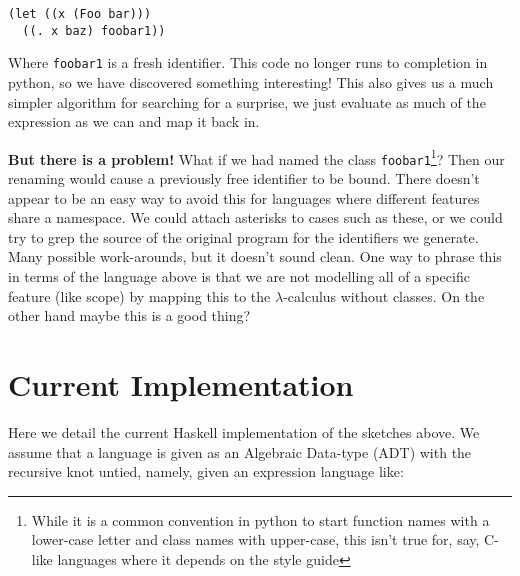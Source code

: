 \documentclass[12pt]{article}
\begin{document}
\begin{verbatim}
(let ((x (Foo bar)))
  ((. x baz) foobar1))
\end{verbatim}

Where \texttt{foobar1} is a fresh identifier. This code no longer runs to
completion in python, so we have discovered something interesting! This also
gives us a much simpler algorithm for searching for a surprise, we just
evaluate as much of the expression as we can and map it back in.

\textbf{But there is a problem!} What if we had named the class
\texttt{foobar1}\footnote{While it is a common convention in python to start
  function names with a lower-case letter and class names with upper-case,
  this isn't true for, say, C-like languages where it depends on the style
guide}? Then our renaming would cause a previously free identifier to be
bound. There doesn't appear to be an easy way to avoid this for languages
where different features share a namespace. We could attach asterisks to
cases such as these, or we could try to grep the source of the original
program for the identifiers we generate. Many possible work-arounds, but it
doesn't sound clean. One way to phrase this in terms of the language above
is that we are not modelling all of a specific feature (like scope) by
mapping this to the $\lambda$-calculus without classes. On the other hand
maybe this is a good thing?




\section{Current Implementation}

Here we detail the current Haskell implementation of the sketches above. We
assume that a language is given as an Algebraic Data-type (ADT) with the
recursive knot untied, namely, given an expression language like:
\end{document}

